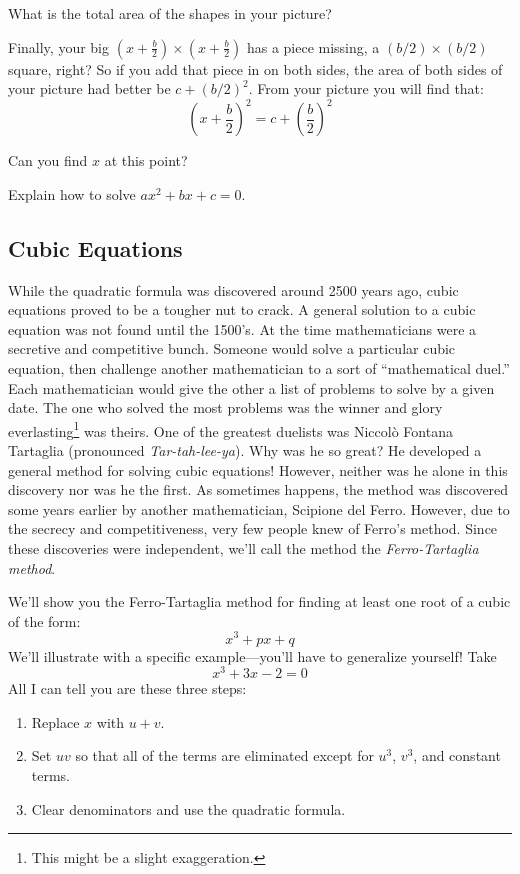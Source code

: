 \documentclass{ximera}
\begin{document}
\begin{question} What is the total area of the shapes in your picture?
\end{question}


Finally, your big $(x + \frac{b}{2}) \times (x + \frac{b}{2})$ has a
piece missing, a $(b/2) \times (b/2)$ square, right? So if you add
that piece in on both sides, the area of both sides of your picture
had better be $c + (b/2)^2$. From your picture you will find that:
\[
\left(x + \frac{b}{2}\right)^2 = c + \left(\frac{b}{2}\right)^2
\]

\begin{question} 
Can you find $x$ at this point?
\end{question}


\begin{question}
Explain how to solve $ax^2 + bx + c = 0$.
\end{question}



\subsection*{Cubic Equations}

While the quadratic formula was discovered around 2500 years ago,
cubic equations proved to be a tougher nut to crack. A general
solution to a cubic equation was not found until the 1500's. At the
time mathematicians were a secretive and competitive bunch. Someone
would solve a particular cubic equation, then challenge another
mathematician to a sort of ``mathematical duel.'' Each mathematician
would give the other a list of problems to solve by a given date. The
one who solved the most problems was the winner and glory
everlasting\footnote{This might be a slight exaggeration.}  was
theirs. One of the greatest duelists was Niccol\`{o} Fontana Tartaglia
(pronounced \textit{Tar-tah-lee-ya}). Why was he so great? He
developed a general method for solving cubic equations! However,
neither was he alone in this discovery nor was he the first. As
sometimes happens, the method was discovered some years earlier by
another mathematician, Scipione del Ferro. However, due to the secrecy
and competitiveness, very few people knew of Ferro's method. Since these
discoveries were independent, we'll call the method the
\textit{Ferro-Tartaglia method}.

We'll show you the Ferro-Tartaglia method for finding at least one root of a cubic of the form:
\[
x^3+ px + q
\]
We'll illustrate with a specific example---you'll have to generalize
yourself! Take
\[
x^3 +3x - 2  = 0
\]
All I can tell you are these three steps:
\begin{enumerate}
\item Replace $x$ with $u+v$. 
\item Set $uv$ so that all of the terms are eliminated except for $u^3$,
$v^3$, and constant terms.  
\item Clear denominators and use the quadratic formula.
\end{enumerate}
\end{document}
